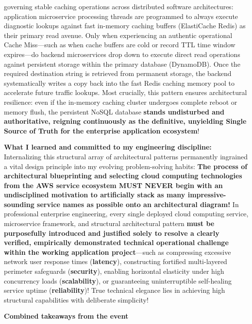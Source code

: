 \begin{itemize}
  governing stable caching operations across distributed software
  architectures: application microservice processing threads are
  programmed to always execute diagnostic lookups against fast in-memory
  caching buffers (ElastiCache Redis) as their primary read avenue. Only
  when experiencing an authentic operational Cache Miss---such as when
  cache buffers are cold or record TTL time window expires---do backend
  microservices drop down to execute direct read operations against
  persistent storage within the primary database (DynamoDB). Once the
  required destination string is retrieved from permanent storage, the
  backend systematically writes a copy back into the fast Redis caching
  memory pool to accelerate future traffic lookups. Most crucially, this
  pattern ensures architectural resilience: even if the in-memory
  caching cluster undergoes complete reboot or memory flush, the
  persistent NoSQL database \textbf{stands undisturbed and
  authoritative, reigning continuously as the definitive, unyielding
  Single Source of Truth for the enterprise application ecosystem}!
\end{itemize}

\textbf{What I learned and committed to my engineering discipline:}
Internalizing this structural array of architectural patterns
permanently ingrained a vital design principle into my evolving
problem-solving habits: \textbf{The process of architectural
blueprinting and selecting cloud computing technologies from the AWS
service ecosystem MUST NEVER begin with an undisciplined motivation to
artificially stack as many impressive-sounding service names as possible
onto an architectural diagram!} In professional enterprise engineering,
every single deployed cloud computing service, microservice framework,
and structural architectural pattern \textbf{must be purposefully
introduced and justified solely to resolve a clearly verified,
empirically demonstrated technical operational challenge within the
working application project}---such as compressing excessive network
user response times (\textbf{latency}), constructing fortified
multi-layered perimeter safeguards (\textbf{security}), enabling
horizontal elasticity under high concurrency loads
(\textbf{scalability}), or guaranteeing uninterruptible self-healing
service uptime (\textbf{reliability})! True technical elegance lies in
achieving high structural capabilities with deliberate simplicity!

\vspace{0.5em}\noindent\textbf{Combined takeaways from the
event}\par

